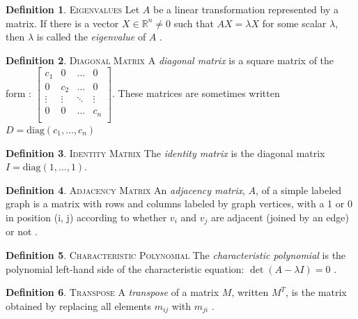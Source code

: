 \documentclass[11pt]{article}
\newcommand{\R}{\mathbb{R}}
\theoremstyle{definition}
\newtheorem{definition}{Definition}[section]
\begin{document}
	\theoremstyle{definition}
	\begin{definition}{\textsc{Eigenvalues}}
		Let $A$ be a linear transformation represented by a matrix. If there is a vector $X \in \R^n \neq 0$ such that $AX = \lambda X$ for some scalar $\lambda$, then $\lambda$ is called the \emph{eigenvalue} of $A$ \cite{mathworld:Eigenvalue}.
	\end{definition}
	
	\theoremstyle{definition}
	\begin{definition}{\textsc{Diagonal Matrix}}
		A \emph{diagonal matrix} is a square matrix of the form \cite{mathworld:DiagonalMatrix}:
		$\begin{bmatrix}
			c_1 & 0 & \dots & 0 \\
			0 & c_2 & \dots & 0 \\
			\vdots & \vdots  & \ddots  & \vdots \\
			0 & 0 & \dots & c_n \\
		\end{bmatrix}$. These matrices are sometimes written $D = \text{diag}(c_1, \dots, c_n)$
	\end{definition}
	
	\theoremstyle{definition}
	\begin{definition}{\textsc{Identity Matrix}}
		The \emph{identity matrix} is the diagonal matrix $I = \text{diag}(1, \dots, 1)$.
	\end{definition}
	
	\theoremstyle{definition}
	\begin{definition}{\textsc{Adjacency Matrix}}
		An \emph{adjacency matrix}, $A$, of a simple labeled graph is a matrix with rows and columns labeled by graph vertices, with a 1 or 0 in position (i, j) according to whether $v_i$ and $v_j$ are adjacent (joined by an edge) or not \cite{mathworld:AdjacencyMatrix}. 
	\end{definition}
	
	\theoremstyle{definition}
	\begin{definition}{\textsc{Characteristic Polynomial}}
		The \emph{characteristic polynomial} is the polynomial left-hand side of the characteristic equation: $\det(A - \lambda I) = 0$ \cite{mathworld:CharacteristicPoly}.
	\end{definition}
	
	\theoremstyle{definition}
	\begin{definition}{\textsc{Transpose}}
		A \emph{transpose} of a matrix $M$, written $M^T$, is the matrix obtained by replacing all elements $m_{ij}$ with $m_{ji}$ \cite{mathworld:Transpose}.
	\end{definition}
	
\end{document}
